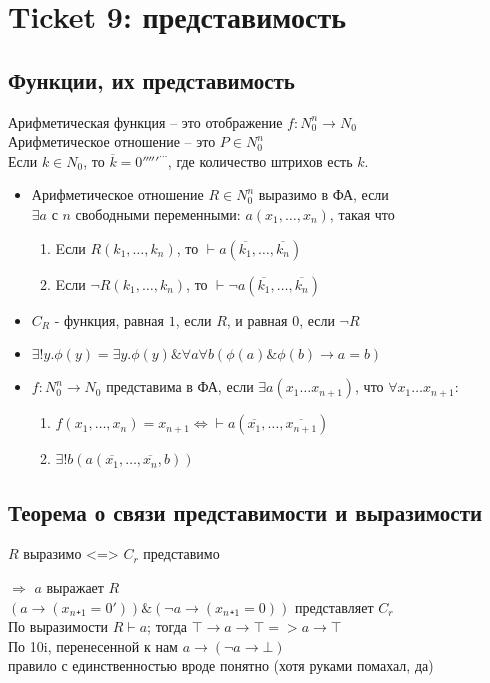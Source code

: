 \section{Ticket 9: представимость}
\label{sec-11}
\subsection{Функции, их представимость}
\label{sec-11-1}
Арифметическая функция -- это отображение $f: N_0^n \to N_0$ \\
Арифметическое отношение -- это $P \in N_0^n$ \\
Если $k \in N_0$, то $\overline k = 0'''''^\cdots$, где количество штрихов есть $k$.
\begin{itemize}
\item Арифметическое отношение $R \in N_0^n$ выразимо в ФА, если\\
$\exists a$ с $n$ свободными переменными:
$a(x_1,\dotsc, x_n)$, такая что
\begin{enumerate}
\item Eсли $R(k_1,\dotsc, k_n)$, то $\vdash a(\overline{k_1}, \dotsc, \overline{k_n})$
\item Eсли $\lnot R(k_1, \dotsc, k_n)$, то $\vdash \lnot a(\overline{k_1}, \dotsc, \overline{k_n})$
\end{enumerate}
\item $C_R$ - функция, равная $1$, если $R$, и равная $0$, если $\lnot R$
\item $\exists !y.\phi(y) = \exists y.\phi(y) \& \forall a\forall b(\phi(a) \& \phi(b) \to a = b)$
\item $f: N_0^n \to N_0$ представима в ФА, если $\exists a(x_1\ldots{}x_{n+1})$, что
$\forall x_1\dotsc x_{n+1}:$
\begin{enumerate}
\item $f(x_1, \dotsc, x_n) = x_{n+1} \Leftrightarrow \vdash a(\overline{x_1}, \dotsc, \overline{x_{n+1}})$
\item $\exists !b(a(\overline{x_1}, \dotsc, \overline{x_n}, b))$
\end{enumerate}
\end{itemize}
\subsection{Теорема о связи представимости и выразимости}
\label{sec-11-2}
$R$ выразимо <=> $C_r$ представимо

$\Rightarrow$ $a$ выражает $R$\\
$(a \to (x_n₊_1=0')) \& (\lnot a \to (x_n₊_1=0))$
представляет $C_r$\\
По выразимости $R \vdash a$; тогда $⊤\to a\to ⊤ => a\to ⊤$\\
По 10i, перенесенной к нам $a \to (\lnot a \to ⊥)$\\
правило с единственностью вроде понятно (хотя руками помахал, да)

